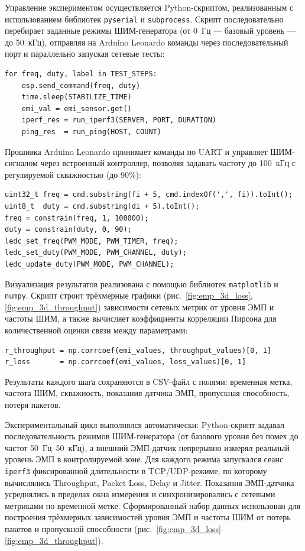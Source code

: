 
Управление экспериментом осуществляется Python-скриптом,
реализованным с использованием библиотек \texttt{pyserial}
и \texttt{subprocess}. Скрипт последовательно перебирает
заданные режимы ШИМ-генератора (от 0~Гц --- базовый уровень ---
до 50~кГц), отправляя на Arduino Leonardo команды через
последовательный порт и параллельно запуская сетевые тесты:

\begin{verbatim}
for freq, duty, label in TEST_STEPS:
    esp.send_command(freq, duty)
    time.sleep(STABILIZE_TIME)
    emi_val = emi_sensor.get()
    iperf_res = run_iperf3(SERVER, PORT, DURATION)
    ping_res  = run_ping(HOST, COUNT)
\end{verbatim}

Прошивка Arduino Leonardo принимает команды по UART и управляет
ШИМ-сигналом через встроенный контроллер,
позволяя задавать частоту до 100~кГц
с регулируемой скважностью (до 90\%):

\begin{verbatim}
uint32_t freq = cmd.substring(fi + 5, cmd.indexOf(',', fi)).toInt();
uint8_t  duty = cmd.substring(di + 5).toInt();
freq = constrain(freq, 1, 100000);
duty = constrain(duty, 0, 90);
ledc_set_freq(PWM_MODE, PWM_TIMER, freq);
ledc_set_duty(PWM_MODE, PWM_CHANNEL, duty);
ledc_update_duty(PWM_MODE, PWM_CHANNEL);
\end{verbatim}

Визуализация результатов реализована с помощью
библиотек \texttt{matplotlib} и \texttt{numpy}.
Скрипт строит трёхмерные графики (рис.~\ref{fig:emp_3d_loss},
\ref{fig:emp_3d_throughput}) зависимости
сетевых метрик от уровня ЭМП и частоты ШИМ,
а также вычисляет коэффициенты корреляции Пирсона
для количественной оценки связи между параметрами:

\begin{verbatim}
r_throughput = np.corrcoef(emi_values, throughput_values)[0, 1]
r_loss       = np.corrcoef(emi_values, loss_values)[0, 1]
\end{verbatim}

Результаты каждого шага сохраняются в CSV-файл
с полями: временная метка, частота ШИМ, скважность,
показания датчика ЭМП, пропускная способность,
потеря пакетов.


Экспериментальный цикл выполнялся автоматически: Python-скрипт
задавал последовательность режимов ШИМ-генератора
(от базового уровня без помех до частот 50~Гц--50~кГц),
а внешний ЭМП-датчик непрерывно измерял реальный уровень ЭМП
в контролируемой зоне. Для каждого режима запускался сеанс
\texttt{iperf3} фиксированной длительности в TCP/UDP-режиме,
по которому вычислялись Throughput, Packet Loss, Delay и Jitter.
Показания ЭМП-датчика усреднялись в пределах окна измерения
и синхронизировались с сетевыми метриками по временной метке.
Сформированный набор данных использован для построения
трёхмерных зависимостей уровня ЭМП и частоты ШИМ от потерь пакетов
и пропускной способности (рис.~\ref{fig:emp_3d_loss}--\ref{fig:emp_3d_throughput}).

